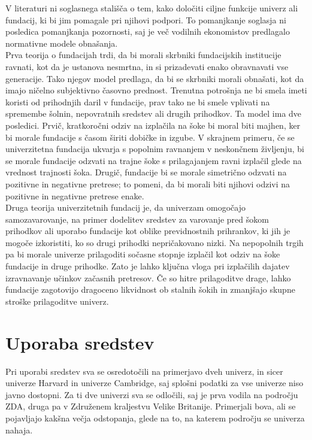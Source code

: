 \documentclass[12pt, a4paper]{article}
\begin{document}
V literaturi ni soglasnega stališča o tem, kako določiti ciljne funkcije univerz ali fundacij, ki bi jim pomagale pri njihovi podpori. To pomanjkanje soglasja ni posledica pomanjkanja pozornosti, saj je več vodilnih ekonomistov predlagalo normativne modele obnašanja. \\

Prva teorija o fundacijah trdi, da bi morali skrbniki fundacijskih institucije ravnati, kot da je ustanova nesmrtna, in si prizadevati enako obravnavati vse generacije. Tako njegov model predlaga, da bi se skrbniki morali obnašati, kot da imajo ničelno subjektivno časovno prednost. Trenutna potrošnja ne bi smela imeti koristi od prihodnjih daril v fundacije, prav tako ne bi smele vplivati na spremembe šolnin, nepovratnih sredstev ali drugih prihodkov. Ta model ima dve posledici. Prvič, kratkoročni odziv na izplačila na šoke bi moral biti majhen, ker bi morale fundacije s časom širiti dobičke in izgube. V skrajnem primeru, če se univerzitetna fundacija ukvarja s popolnim ravnanjem v neskončnem življenju, bi se morale fundacije odzvati na trajne šoke s prilagajanjem ravni izplačil glede na vrednost trajnosti šoka. Drugič, fundacije bi se morale simetrično odzvati na pozitivne in negativne pretrese; to pomeni, da bi morali biti njihovi odzivi na pozitivne in negativne pretrese enake.\\

Druga teorija univerzitetnih fundacij je, da univerzam omogočajo samozavarovanje, na primer dodelitev sredstev za varovanje pred šokom prihodkov ali uporabo fundacije kot oblike previdnostnih prihrankov, ki jih je mogoče izkoristiti, ko so drugi prihodki nepričakovano nizki. Na nepopolnih trgih pa bi morale univerze prilagoditi sočasne stopnje izplačil kot odziv na šoke fundacije in druge prihodke. Zato je lahko ključna vloga pri izplačilih dajatev izravnavanje učinkov začasnih pretresov. Če so hitre prilagoditve drage, lahko fundacije zagotovijo dragoceno likvidnost ob stalnih šokih in zmanjšajo skupne stroške prilagoditve univerz. \cite{soki}\\


\section[Uporaba sredstev]{Uporaba sredstev}

Pri uporabi sredstev sva se osredotočili na primerjavo dveh univerz, in sicer univerze Harvard in univerze Cambridge, saj splošni podatki za vse univerze niso javno dostopni. Za ti dve univerzi sva se odločili, saj je prva vodila na področju ZDA, druga pa v Združenem kraljestvu Velike Britanije. Primerjali bova, ali se pojavljajo kakšna večja odstopanja, glede na to, na katerem področju se univerza nahaja. 
\end{document}
